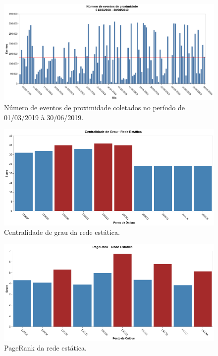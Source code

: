 \begin{figure}
\centering
\includegraphics[width=.9\textwidth]{Capitulo4/img/eventos_proximidade.png}
\caption{Número de eventos de proximidade coletados no período de 01/03/2019 à 30/06/2019.}
\label{fig:eventos-de-proximidade}
\end{figure}


\begin{figure}
\centering
\includegraphics[width=.9\textwidth]{Capitulo4/img/centralidade-grau.png}
\caption{Centralidade de grau da rede estática.}
\label{fig:eventos-de-proximidade}
\end{figure}

\begin{figure}
\centering
\includegraphics[width=.9\textwidth]{Capitulo4/img/pagerank.png}
\caption{PageRank da rede estática.}
\label{fig:eventos-de-proximidade}
\end{figure}


